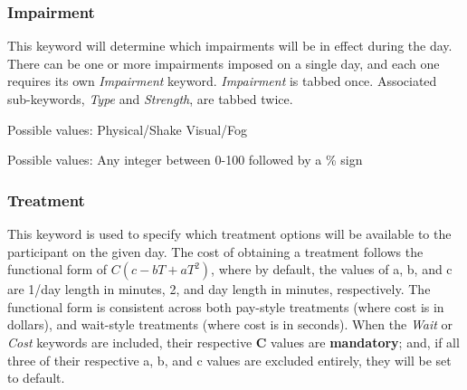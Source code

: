 \documentclass{article}
\begin{document}
\subsubsection{Impairment}
This keyword will determine which impairments will be in effect during the day. There can be one or more impairments imposed on a single day, and each one requires its own \textit{Impairment} keyword. \textit{Impairment} is tabbed once. Associated sub-keywords, \textit{Type} and \textit{Strength}, are tabbed twice. \newline

 \newline
\indent Possible values: \newline
\indent\indent Physical/Shake \newline
\indent\indent Visual/Fog \newline


 \newline
\indent Possible values: \newline
\indent\indent Any integer between 0-100 followed by a \% sign \newline
    

\subsubsection{Treatment}
This keyword is used to specify which treatment options will be available to the participant on the given day. The cost of obtaining a treatment follows the functional form of $C(c - bT + aT^2)$, where by default, the values of a, b, and c are 1\slash day length in minutes, 2, and day length in minutes, respectively. The functional form is consistent across both pay-style treatments (where cost is in dollars), and wait-style treatments (where cost is in seconds). When the \textit{Wait} or \textit{Cost} keywords are included, their respective \textbf{C} values are \textbf{mandatory}; and, if all three of their respective a, b, and c values are excluded entirely, they will be set to default. 
\end{document}

